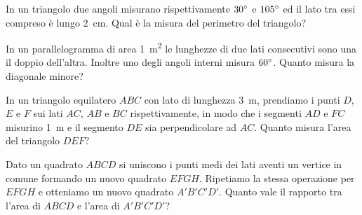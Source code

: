\begin{multicols}{2}
\begin{esercizio}
\label{ese:7.111}
In un triangolo due angoli misurano rispettivamente $30{}^{\circ}$ e $105{}^{\circ}$ ed il lato tra essi compreso è lungo 2~cm. Qual è la misura del perimetro del triangolo? 
\end{esercizio}

\begin{esercizio}
\label{ese:7.112}
In un parallelogramma di area 1~m\textsuperscript{2} le lunghezze di due lati consecutivi sono una il doppio dell'altra. Inoltre uno degli angoli interni misura $60{}^{\circ}$. Quanto misura la diagonale minore?
\end{esercizio}

\begin{esercizio}
\label{ese:7.113}
In un triangolo equilatero $ABC$ con lato di lunghezza 3~m, prendiamo i punti $D$, $E$ e $F$ sui lati $AC$, $AB$ e $BC$ rispettivamente, in modo che i segmenti $AD$ e $FC$ misurino 1~m e il segmento $DE$ sia perpendicolare ad $AC$. Quanto misura l'area del triangolo $DEF$?
\end{esercizio}

\begin{esercizio}
\label{ese:7.114}
Dato un quadrato $ABCD$ si uniscono i punti medi dei lati aventi un vertice in comune formando un nuovo quadrato $EFGH$. Ripetiamo la stessa operazione per $EFGH$ e otteniamo un nuovo quadrato $A'B'C'D'$. Quanto vale il rapporto tra l'area di $ABCD$ e l'area di $A'B'C'D'$?
\end{esercizio}

\end{multicols}
